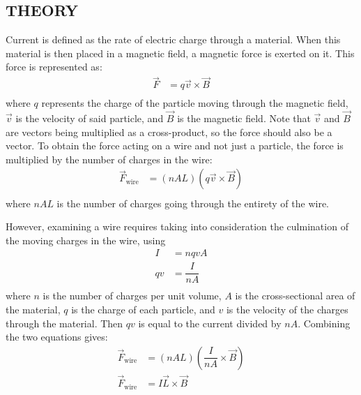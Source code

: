 \documentclass [12pt, letterpaper, twoside]{article}
\begin{document}
\subsection*{THEORY}
Current is defined as the rate of electric charge through a material. When this material is then placed in a magnetic field, a magnetic force is exerted on it. This force is represented as:
\begin{equation*}
  \begin{split}
    \vec{F} &= q\vec{v}\times{\vec{B}} \\
  \end{split}
\end{equation*}
where \(q\) represents the charge of the particle moving through the magnetic field, \(\vec{v}\) is the velocity of said particle, and \(\vec{B}\) is the magnetic field. Note that \(\vec{v}\) and \(\vec{B}\) are vectors being multiplied as a cross-product, so the force should also be a vector. To obtain the force acting on a wire and not just a particle, the force is multiplied by the number of charges in the wire:
\begin{equation*}
  \begin{split}
    \vec{F}_{\text{wire}} &= (nAL)(q\vec{v}\times{\vec{B}}) \\
  \end{split}
\end{equation*}
where \(nAL\) is the number of charges going through the entirety of the wire.

\noindent
However, examining a wire requires taking into consideration the culmination of the moving charges in the wire, using
\begin{equation}
  \begin{split}
    I &= nqvA \\
    qv &= \dfrac{I}{nA} \\ 
  \end{split}
\end{equation}
where \(n\) is the number of charges per unit volume, \(A\) is the cross-sectional area of the material, \(q\) is the charge of each particle, and \(v\) is the velocity of the charges through the material. Then \(qv\) is equal to the current divided by \(nA\). Combining the two equations gives:
\begin{equation}
  \begin{split}
    \vec{F}_{\text{wire}} &= (nAL)\left(\dfrac{I}{nA}\times{\vec{B}}\right) \\
    \vec{F}_{\text{wire}} &= I\vec{L}\times\vec{B} \\
  \end{split}
\end{equation}
\end{document}
